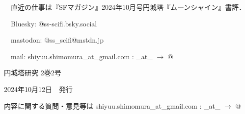 \documentclass[10pt, a5paper, twoside]{jsarticle}
\theoremstyle{definition}
\begin{document}
	　直近の仕事は『SFマガジン』2024年10月号円城塔『ムーンシャイン』書評．

	　Bluesky: @ss-scifi.bsky.social

	　mastodon: @ss\_scifi@mstdn.jp

	　mail: shiyuu.shimomura\_at\_gmail.com : \_at\_ $\rightarrow$ @

	\vfill

	\hrulefill

	\center

	{\Large 円城塔研究 2巻2号}

	2024年10月12日　発行


	\hrulefill

	内容に関する質問・意見等は shiyuu.shimomura\_at\_gmail.com : \_at\_ $\rightarrow$ @
\end{document}
